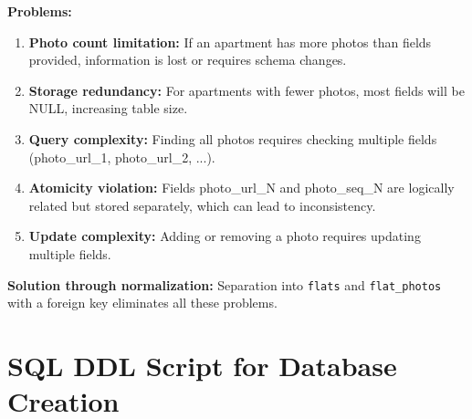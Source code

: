 \documentclass[12pt,a4paper]{article}
\begin{document}
\textbf{Problems:}
\begin{enumerate}
    \item \textbf{Photo count limitation:} If an apartment has more photos than fields provided, information is lost or requires schema changes.
    
    \item \textbf{Storage redundancy:} For apartments with fewer photos, most fields will be NULL, increasing table size.
    
    \item \textbf{Query complexity:} Finding all photos requires checking multiple fields (photo\_url\_1, photo\_url\_2, ...).
    
    \item \textbf{Atomicity violation:} Fields photo\_url\_N and photo\_seq\_N are logically related but stored separately, which can lead to inconsistency.
    
    \item \textbf{Update complexity:} Adding or removing a photo requires updating multiple fields.
\end{enumerate}

\textbf{Solution through normalization:} Separation into \texttt{flats} and \texttt{flat\_photos} with a foreign key eliminates all these problems.

\section{SQL DDL Script for Database Creation}
\end{document}

